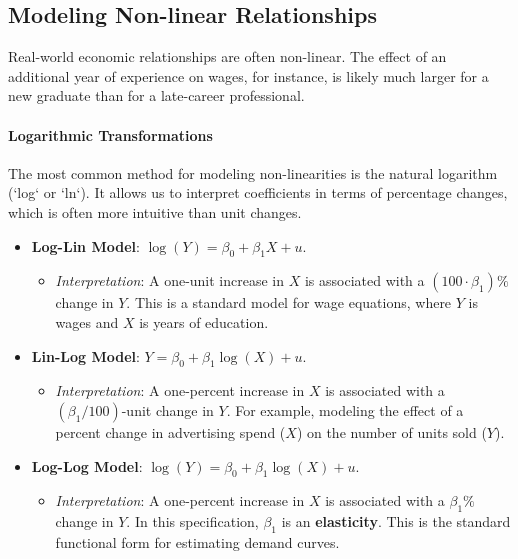 \documentclass{article}
\providecommand{\tightlist}{
  \setlength{\itemsep}{0pt}
  \setlength{\parskip}{0pt}}
\begin{document}
\subsection{Modeling Non-linear Relationships}
\label{sub:nonlinear}

Real-world economic relationships are often non-linear. The effect of an additional year of experience on wages, for instance, is likely much larger for a new graduate than for a late-career professional.

\paragraph{Logarithmic Transformations}
The most common method for modeling non-linearities is the natural logarithm (`log` or `ln`). It allows us to interpret coefficients in terms of percentage changes, which is often more intuitive than unit changes.

\begin{itemize}
    \tightlist
    \item \textbf{Log-Lin Model}: $\log(Y) = \beta_0 + \beta_1 X + u$.
    \begin{itemize}
        \item \textit{Interpretation}: A one-unit increase in $X$ is associated with a $(100 \cdot \beta_1)\%$ change in $Y$. This is a standard model for wage equations, where $Y$ is wages and $X$ is years of education.
    \end{itemize}
    
    \item \textbf{Lin-Log Model}: $Y = \beta_0 + \beta_1 \log(X) + u$.
    \begin{itemize}
        \item \textit{Interpretation}: A one-percent increase in $X$ is associated with a $(\beta_1/100)$-unit change in $Y$. For example, modeling the effect of a percent change in advertising spend ($X$) on the number of units sold ($Y$).
    \end{itemize}
    
    \item \textbf{Log-Log Model}: $\log(Y) = \beta_0 + \beta_1 \log(X) + u$.
    \begin{itemize}
        \item \textit{Interpretation}: A one-percent increase in $X$ is associated with a $\beta_1\%$ change in $Y$. In this specification, $\beta_1$ is an \textbf{elasticity}. This is the standard functional form for estimating demand curves.
    \end{itemize}
\end{itemize}
\end{document}
